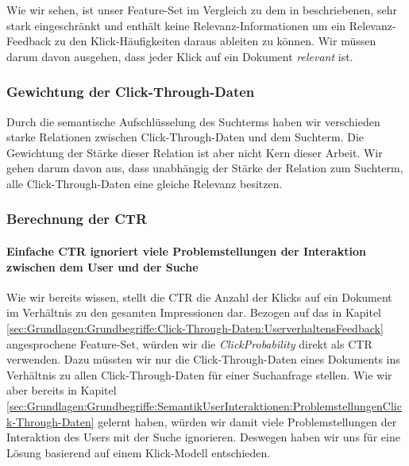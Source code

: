 Wie wir sehen, ist unser Feature-Set im Vergleich zu dem in \cite{IWUSBI} beschriebenen, sehr stark eingeschränkt und enthält keine Relevanz-Informationen um ein Relevanz-Feedback zu den Klick-Häufigkeiten daraus ableiten zu können. Wir müssen darum davon ausgehen, dass jeder Klick auf ein Dokument \textit{relevant} ist.

\subsubsection{Gewichtung der Click-Through-Daten}
\label{sec:Reranking:Methodik:Click-Through-Daten:Gewichtung}

Durch die semantische Aufschlüsselung des Suchterms haben wir verschieden starke Relationen zwischen Click-Through-Daten und dem Suchterm. Die Gewichtung der Stärke dieser Relation ist aber nicht Kern dieser Arbeit. Wir gehen darum davon aus, dass unabhängig der Stärke der Relation zum Suchterm, alle Click-Through-Daten eine gleiche Relevanz besitzen.

\subsubsection{Berechnung der CTR}
\label{sec:Reranking:Methodik:Click-Through-Daten:Gewichtung}

\paragraph{Einfache CTR ignoriert viele Problemstellungen der Interaktion zwischen dem User und der Suche} 
Wie wir bereits wissen, stellt die CTR die Anzahl der Klicks auf ein Dokument im Verhältnis zu den gesamten Impressionen dar. Bezogen auf das in Kapitel \ref{sec:Grundlagen:Grundbegriffe:Click-Through-Daten:UserverhaltensFeedback} angesprochene Feature-Set, würden wir die \textit{ClickProbability} direkt als CTR verwenden. Dazu müssten wir nur die Click-Through-Daten eines Dokuments ins Verhältnis zu allen Click-Through-Daten für einer Suchanfrage stellen. Wie wir aber bereits in Kapitel \ref{sec:Grundlagen:Grundbegriffe:SemantikUserInteraktionen:ProblemstellungenClick-Through-Daten} gelernt haben, würden wir damit viele Problemstellungen der Interaktion des Users mit der Suche ignorieren. Deswegen haben wir uns für eine Lösung basierend auf einem Klick-Modell entschieden. 

